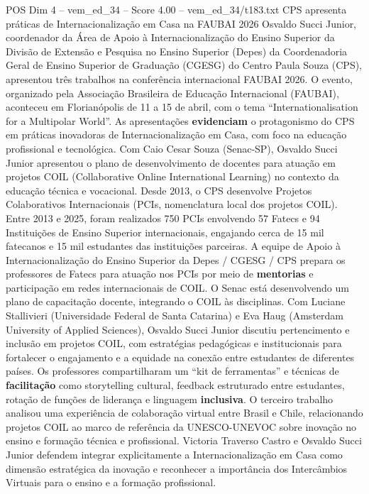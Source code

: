 \begin{textsample}{POS Dim 4 – vem\_ed\_34 – Score 4.00 – vem\_ed\_34/t183.txt}  \label{ex:f4_pos_063}
CPS apresenta práticas de Internacionalização em Casa na FAUBAI 2026 Osvaldo Succi Junior, coordenador da Área de Apoio à Internacionalização do Ensino Superior da Divisão de Extensão e Pesquisa no Ensino Superior (Depes) da Coordenadoria Geral de Ensino Superior de Graduação (CGESG) do Centro Paula Souza (CPS), apresentou três trabalhos na conferência internacional FAUBAI 2026.
O evento, organizado pela Associação Brasileira de Educação Internacional (FAUBAI), aconteceu em Florianópolis de 11 a 15 de abril, com o tema “Internationalisation for a Multipolar World”.
As apresentações \textbf{evidenciam} o protagonismo do CPS em práticas inovadoras de Internacionalização em Casa, com foco na educação profissional e tecnológica.
Com Caio Cesar Souza (Senac-SP), Osvaldo Succi Junior apresentou o plano de desenvolvimento de docentes para atuação em projetos COIL (Collaborative Online International Learning) no contexto da educação técnica e vocacional.
Desde 2013, o CPS desenvolve Projetos Colaborativos Internacionais (PCIs, nomenclatura local dos projetos COIL).
Entre 2013 e 2025, foram realizados 750 PCIs envolvendo 57 Fatecs e 94 Instituições de Ensino Superior internacionais, engajando cerca de 15 mil fatecanos e 15 mil estudantes das instituições parceiras.
A equipe de Apoio à Internacionalização do Ensino Superior da Depes / CGESG / CPS prepara os professores de Fatecs para atuação nos PCIs por meio de \textbf{mentorias} e participação em redes internacionais de COIL.
O Senac está desenvolvendo um plano de capacitação docente, integrando o COIL às disciplinas.
Com Luciane Stallivieri (Universidade Federal de Santa Catarina) e Eva Haug (Amsterdam University of Applied Sciences), Osvaldo Succi Junior discutiu pertencimento e inclusão em projetos COIL, com estratégias pedagógicas e institucionais para fortalecer o engajamento e a equidade na conexão entre estudantes de diferentes países.
Os professores compartilharam um “kit de ferramentas” e técnicas de \textbf{facilitação} como storytelling cultural, feedback estruturado entre estudantes, rotação de funções de liderança e linguagem \textbf{inclusiva}.
O terceiro trabalho analisou uma experiência de colaboração virtual entre Brasil e Chile, relacionando projetos COIL ao marco de referência da UNESCO-UNEVOC sobre inovação no ensino e formação técnica e profissional.
Victoria Traverso Castro e Osvaldo Succi Junior defendem integrar explicitamente a Internacionalização em Casa como dimensão estratégica da inovação e reconhecer a importância dos Intercâmbios Virtuais para o ensino e a formação profissional.

\end{textsample}
